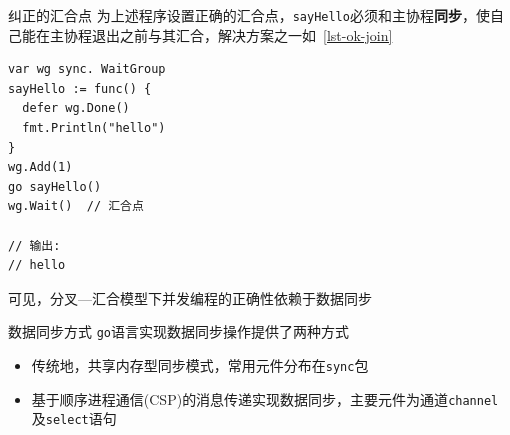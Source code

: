 \begin{frame}[fragile]{纠正的汇合点}
为上述程序设置正确的汇合点，\texttt{sayHello}必须和主协程\textbf{同步}，使自己能在主协程退出之前与其汇合，解决方案之一如\lstlistingname~\ref{lst-ok-join}

\begin{lstlisting}[caption={利用同步确保\texttt{sayHello}在主协程退出之前与其汇合},label=lst-ok-join]
var wg sync. WaitGroup
sayHello := func() {
  defer wg.Done()
  fmt.Println("hello")
}
wg.Add(1)
go sayHello()
wg.Wait()  // 汇合点

// 输出:
// hello    
\end{lstlisting}

\alert{可见，分叉---汇合模型下并发编程的正确性依赖于数据同步}
\end{frame}

\begin{frame}{数据同步方式}
\texttt{go}语言实现数据同步操作提供了两种方式
\begin{itemize}
    \item 传统地，\alert{共享内存型同步模式}，常用元件分布在\texttt{sync}包
    \item \alert{基于顺序进程通信(CSP)}的消息传递实现数据同步，主要元件为通道\texttt{channel}及\texttt{select}语句
\end{itemize}
\end{frame}